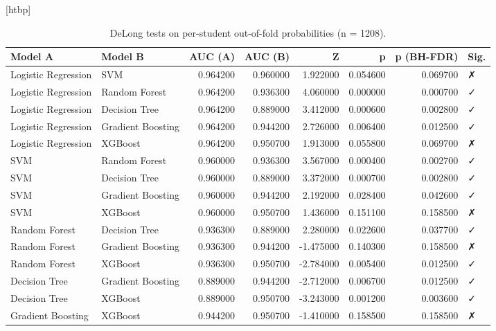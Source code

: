 \begin{table}
\small[htbp]
\caption{DeLong tests on per-student out-of-fold probabilities (n = 1208).}
\label{tab:P05_delong_oof}
\begin{tabular}{llrrrrrl}
\toprule
Model A & Model B & AUC (A) & AUC (B) & Z & p & p (BH-FDR) & Sig. \\
\midrule
Logistic Regression & SVM & 0.964200 & 0.960000 & 1.922000 & 0.054600 & 0.069700 & ✗ \\
Logistic Regression & Random Forest & 0.964200 & 0.936300 & 4.060000 & 0.000000 & 0.000700 & ✓ \\
Logistic Regression & Decision Tree & 0.964200 & 0.889000 & 3.412000 & 0.000600 & 0.002800 & ✓ \\
Logistic Regression & Gradient Boosting & 0.964200 & 0.944200 & 2.726000 & 0.006400 & 0.012500 & ✓ \\
Logistic Regression & XGBoost & 0.964200 & 0.950700 & 1.913000 & 0.055800 & 0.069700 & ✗ \\
SVM & Random Forest & 0.960000 & 0.936300 & 3.567000 & 0.000400 & 0.002700 & ✓ \\
SVM & Decision Tree & 0.960000 & 0.889000 & 3.372000 & 0.000700 & 0.002800 & ✓ \\
SVM & Gradient Boosting & 0.960000 & 0.944200 & 2.192000 & 0.028400 & 0.042600 & ✓ \\
SVM & XGBoost & 0.960000 & 0.950700 & 1.436000 & 0.151100 & 0.158500 & ✗ \\
Random Forest & Decision Tree & 0.936300 & 0.889000 & 2.280000 & 0.022600 & 0.037700 & ✓ \\
Random Forest & Gradient Boosting & 0.936300 & 0.944200 & -1.475000 & 0.140300 & 0.158500 & ✗ \\
Random Forest & XGBoost & 0.936300 & 0.950700 & -2.784000 & 0.005400 & 0.012500 & ✓ \\
Decision Tree & Gradient Boosting & 0.889000 & 0.944200 & -2.712000 & 0.006700 & 0.012500 & ✓ \\
Decision Tree & XGBoost & 0.889000 & 0.950700 & -3.243000 & 0.001200 & 0.003600 & ✓ \\
Gradient Boosting & XGBoost & 0.944200 & 0.950700 & -1.410000 & 0.158500 & 0.158500 & ✗ \\
\bottomrule
\end{tabular}
\end{table}
